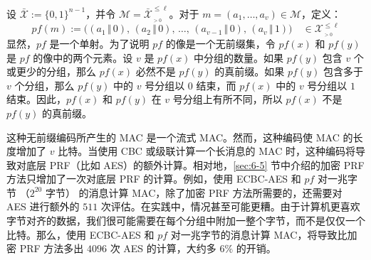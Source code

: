 \begin{snote}[方法 2：停止比特。]
设 $\mathcal{\bar{X}}:=\{0,1\}^{n-1}$，并令 $\mathcal{M}=\mathcal{\bar{X}}^{\leq\ell}_{_{>0}}$。对于 $m=(a_1,\dots,a_v)\in\mathcal{M}$，定义：
\[
pf(m):=\big((a_1\,\Vert\,0),\,(a_2\,\Vert\,0),\,\dots,\,(a_{v-1}\,\Vert\,0),\,(a_v\,\Vert\,1)\big)\quad\in\mathcal{X}^{\leq\ell}_{_{>0}}
\]
显然，$pf$ 是一个单射。为了说明 $pf$ 的像是一个无前缀集，令 $pf(x)$ 和 $pf(y)$ 是 $pf$ 的像中的两个元素。设 $v$ 是 $pf(x)$ 中分组的数量。如果 $pf(y)$ 包含 $v$ 个或更少的分组，那么 $pf(x)$ 必然不是 $pf(y)$ 的真前缀。如果 $pf(y)$ 包含多于 $v$ 个分组，那么 $pf(y)$ 中的 $v$ 号分组以 $0$ 结束，而 $pf(x)$ 中的 $v$ 号分组以 $1$ 结束。因此，$pf(x)$ 和 $pf(y)$ 在 $v$ 号分组上有所不同，所以 $pf(x)$ 不是 $pf(y)$ 的真前缀。

这种无前缀编码所产生的 MAC 是一个流式 MAC。然而，这种编码使 MAC 的长度增加了 $v$ 比特。当使用 CBC 或级联计算一个长消息的 MAC 时，这种编码将导致对底层 PRF（比如 AES）的额外计算。相对地，\ref{sec:6-5} 节中介绍的加密 PRF 方法只增加了一次对底层 PRF 的计算。例如，使用 ECBC-AES 和 $pf$ 对一兆字节 （$2^{20}$ 字节） 的消息计算 MAC，除了加密 PRF 方法所需要的，还需要对 AES 进行额外的 $511$ 次评估。在实践中，情况甚至可能更糟。由于计算机更喜欢字节对齐的数据，我们很可能需要在每个分组中附加一整个字节，而不是仅仅一个比特。那么，使用 ECBC-AES 和 $pf$ 对一兆字节的消息计算 MAC，将导致比加密 PRF 方法多出 $4096$ 次 AES 的计算，大约多 $6\%$ 的开销。
\end{snote}